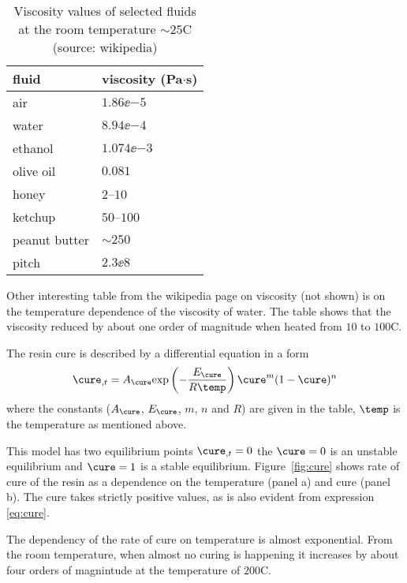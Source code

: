 \documentclass[twoside,a4paper,12pt]{article}
\newcommand{\figref}[1]{Figure~\ref{#1}}
\begin{document}
\begin{table}
  \centering
  \begin{tabular}{ll}
    \toprule
    fluid         & viscosity (Pa$\cdot$s) \\
    \midrule
    air           & $1.86\ee{-5}$          \\
    water         & $8.94\ee{-4}$          \\
    ethanol       & $1.074\ee{-3}$         \\ 
    olive oil     & $0.081$                \\
    honey         & $2$--$10$              \\
    ketchup       & $50$--$100$            \\
    peanut butter & $\sim 250$             \\
    pitch         & $2.3\ee{8}$            \\
    \bottomrule
  \end{tabular}
  \caption{Viscosity values of selected fluids at the room temperature $\sim 25$\degree C (source: wikipedia)}
  \label{tab:viscos-example}
\end{table}

Other interesting table from the wikipedia page on viscosity (not
shown) is on the temperature dependence of the viscosity of water. The
table shows that the viscosity reduced by about one order of magnitude
when heated from $10$ to $100$\degree C.  


The resin cure is described by a differential equation in a form
%
\begin{align}
  \cure_{,t} =  A_\cure \exp{-\frac{E_\cure }{R\temp}} \cure^m (1-\cure)^n \label{eq:cure}
\end{align}
%
where the constants ($A_\cure$, $E_\cure$, $m$, $n$ and $R$) are
given in the table, $\temp$ is the temperature as mentioned above.

This model has two equilibrium points $\cure_{,t}=0$ the $\cure = 0$ is an unstable equilibrium and $\cure=1$ is a stable equilibrium. \figref{fig:cure} shows rate of cure of the resin as a dependence on the temperature (panel a) and cure (panel b). The cure takes strictly positive values, as is also evident from expression \eqref{eq:cure}. 

The dependency of the rate of cure on temperature is almost exponential. From the room temperature, when almost no curing is happening it increases by about four orders of magnintude at the temperature of $200$\degree C.
\end{document}
